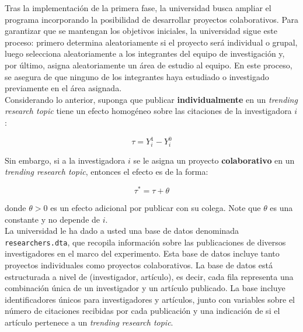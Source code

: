 \documentclass[a4paper, answers, addpoints, 11pt]{exam}
\begin{document}
Tras la implementación de la primera fase, la universidad busca ampliar el programa incorporando la posibilidad de desarrollar proyectos colaborativos. Para garantizar que se mantengan los objetivos iniciales, la universidad sigue este proceso: primero determina aleatoriamente si el proyecto será individual o grupal, luego selecciona aleatoriamente a los integrantes del equipo de investigación y, por último, asigna aleatoriamente un área de estudio al equipo. En este proceso, se asegura de que ninguno de los integrantes haya estudiado o investigado previamente en el área asignada. \\

Considerando lo anterior, suponga que publicar \textbf{individualmente} en un \textit{trending research topic} tiene un efecto homogéneo sobre las citaciones de la investigadora $i$:

\begin{equation*}
    \tau = Y^{1}_{i} - Y^{0}_{i}
\end{equation*}

 Sin embargo, si a la investigadora $i$ se le asigna un proyecto \textbf{colaborativo} en un \textit{trending research topic}, entonces el efecto es de la forma:

\begin{equation*}
    \tau^* = \tau + \theta 
\end{equation*}

donde $\theta > 0$ es un efecto adicional por publicar con su colega. Note que $\theta$ es una constante y no depende de $i$. \\

La universidad le ha dado a usted una base de datos denominada \texttt{researchers.dta}, que recopila información sobre las publicaciones de diversos investigadores en el marco del experimento. Esta base de datos incluye tanto proyectos individuales como proyectos colaborativos. La base de datos está estructurada a nivel de (investigador, artículo), es decir, cada fila representa una combinación única de un investigador y un artículo publicado. La base incluye identificadores únicos para investigadores y artículos, junto con variables sobre el número de citaciones recibidas por cada publicación y una indicación de si el artículo pertenece a un \textit{trending research topic}.
\end{document}
